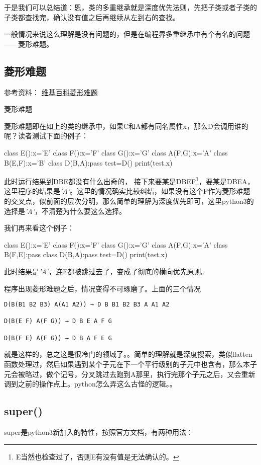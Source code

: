 \documentclass[12pt,oneside]{book}
\begin{document}
\begin{common-format}
于是我们可以总结道：恩，类的多重继承就是深度优先法则，先把子类或者子类的子类都查找完，确认没有值之后再继续从左到右的查找。


一般情况来说这么理解是没有问题的，但是在编程界多重继承中有个有名的问题——菱形难题。

\subsection{菱形难题}
参考资料： \href{http://en.wikipedia.org/wiki/Multiple_inheritance#The_diamond_problem}{维基百科菱形难题}

\begin{fig}{菱形难题}
\caption{菱形难题}
\label{fig:菱形难题}
\end{fig}

菱形难题即在如上的类的继承中，如果C和A都有同名属性x，那么D会调用谁的呢？读者测试下面的例子：
\begin{tcbpython}[]
class E():x='E'
class F():x='F'
class G():x='G'
class A(F,G):x='A'
class B(E,F):x='B'
class D(B,A):pass
test=D()
print(test.x)
\end{tcbpython}
此时运行结果到DBE都没有什么出奇的， 接下来要某是DBEF\footnote{E当然也检查过了，否则E有没有值是无法确认的。}，要某是DBEA，这里程序的结果是\emph{'A'}。这里的情况确实比较纠结，如果没有这个F作为菱形难题的交叉点，似前面的层次分明，那么简单的理解为深度优先即可，这里python3的选择是\emph{'A'}，不清楚为什么要这么选择。

我们再来看这个例子：
\begin{tcbpython}[]
class E():x='E'
class F():x='F'
class G():x='G'
class A(F,G):x='A'
class B(F,E):pass
class D(B,A):pass
test=D()
print(test.x)
\end{tcbpython}
此时结果是\emph{'A'}，连E都被跳过去了，变成了彻底的横向优先原则。

程序出现菱形难题之后，情况变得不可琢磨了。上面的三个情况
\begin{Verbatim}
D(B(B1 B2 B3) A(A1 A2)) → D B B1 B2 B3 A A1 A2

D(B(E F) A(F G)) → D B E A F G

D(B(F E) A(F G)) → D B A F E G
\end{Verbatim}
就是这样的，总之这是很冷门的领域了。。简单的理解就是深度搜索，类似flatten函数处理过，然后如果遇到某个子元在下一个平行级别的子元中也含有，那么本子元会被略过，做个记号，分叉跳过去跑到A那里，执行完那个子元之后，又会重新调到之前的操作点上。python怎么弄这么古怪的逻辑。。



\subsection{super()}
super是python3新加入的特性，按照官方文档，有两种用法：


\end{common-format}
\end{document}
